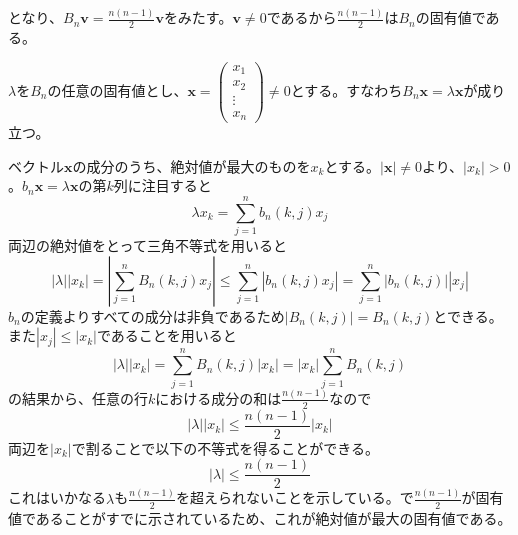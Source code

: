 \begin{souanswer}
\begin{enumerate}
\begin{enumerate_alpha}
\begin{equation*}
\end{equation*}
	となり、$B_n\bm{v}= \frac{n(n- 1)}{2}\bm{v}$をみたす。$\bm{v}\ne 0$であるから$\frac{n(n- 1)}{2}$は$B_n$の固有値である。
	\item $\lambda$を$B_n$の任意の固有値とし、$\bm{x}= \begin{pmatrix}x_1\\ x_2\\ \vdots\\ x_n\end{pmatrix}\ne 0$とする。すなわち$B_n\bm{x}= \lambda\bm{x}$が成り立つ。
\end{enumerate_alpha}
	ベクトル$\bm{x}$の成分のうち、絶対値が最大のものを$x_k$とする。$|\bm{x}|\ne 0$より、$|x_k|> 0$。$b_n\bm{x}= \lambda\bm{x}$の第$k$列に注目すると
\begin{equation*}
	\lambda x_k= \sum_{j= 1}^n b_n(k, j)x_j
\end{equation*}
	両辺の絶対値をとって三角不等式を用いると
\begin{equation*}
	|\lambda||x_k|= \left|\sum_{j= 1}^n B_n(k, j)x_j\right|\le \sum_{j= 1}^n |b_n(k, j)x_j|= \sum_{j= 1}^n |b_n(k, j)||x_j|
\end{equation*}
	$b_n$の定義よりすべての成分は非負であるため$|B_n(k, j)|= B_n(k, j)$とできる。また$|x_j|\le |x_k|$であることを用いると
\begin{equation*}
	|\lambda||x_k|= \sum_{j= 1}^n B_n(k, j)|x_k|= |x_k|\sum_{j= 1}^n B_n(k, j)
\end{equation*}
	の結果から、任意の行$k$における成分の和は$\frac{n(n- 1)}{2}$なので
\begin{equation*}
	|\lambda||x_k|\le \frac{n(n- 1)}{2}|x_k|
\end{equation*}
	両辺を$|x_k|$で割ることで以下の不等式を得ることができる。
\begin{equation*}
	|\lambda|\le \frac{n(n- 1)}{2}
\end{equation*}
	これはいかなる$\lambda$も$\frac{n(n- 1)}{2}$を超えられないことを示している。で$\frac{n(n- 1)}{2}$が固有値であることがすでに示されているため、これが絶対値が最大の固有値である。
\end{enumerate}
\end{souanswer}